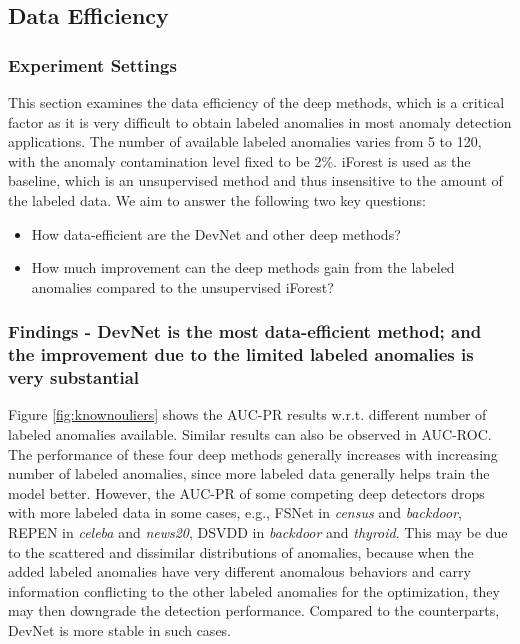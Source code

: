 \documentclass[sigconf]{acmart}
\begin{document}
\subsection{Data Efficiency}\label{exp:labeledanomalies}


\subsubsection{Experiment Settings}
This section examines the data efficiency of the deep methods, which is a critical factor as it is very difficult to obtain labeled anomalies in most anomaly detection applications. The number of available labeled anomalies varies from 5 to 120, with the anomaly contamination level fixed to be 2\%. iForest is used as the baseline, which is an unsupervised method and thus insensitive to the amount of the labeled data. We aim to answer the following two key questions:
\begin{itemize}
    \item How data-efficient are the DevNet and other deep methods?
    \item How much improvement can the deep methods gain from the labeled anomalies compared to the unsupervised iForest?
\end{itemize}

\subsubsection{Findings - DevNet is the most data-efficient method; and the improvement due to the limited labeled anomalies is very substantial}
Figure \ref{fig:knownouliers} shows the AUC-PR results w.r.t. different number of labeled anomalies available. Similar results can also be observed in AUC-ROC. The performance of these four deep methods generally increases with increasing number of labeled anomalies, since more labeled data generally helps train the model better. However, the AUC-PR of some competing deep detectors drops with more labeled data in some cases, e.g., FSNet in \textit{census} and \textit{backdoor}, REPEN in \textit{celeba} and \textit{news20}, DSVDD in \textit{backdoor} and \textit{thyroid}. This may be due to the scattered and dissimilar distributions of anomalies, because when the added labeled anomalies have very different anomalous behaviors and carry information conflicting to the other labeled anomalies for the optimization, they may then downgrade the detection performance. Compared to the counterparts, DevNet is more stable in such cases.
\end{document}
